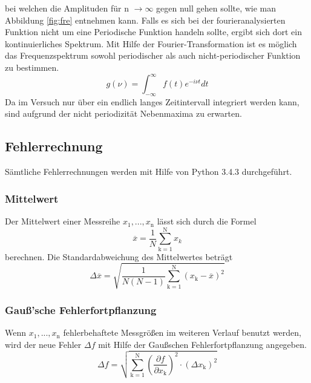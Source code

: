 bei welchen die Amplituden für n $\rightarrow \infty$ gegen null gehen sollte, wie man Abbildung \ref{fig:fre} entnehmen kann. Falls es sich bei der fourieranalysierten Funktion nicht um eine Periodische Funktion handeln sollte, ergibt sich dort ein kontinuierliches Spektrum.
Mit Hilfe der Fourier-Transformation ist es möglich das Frequenzspektrum sowohl periodischer als auch nicht-periodischer Funktion zu bestimmen. 
\begin{equation}
  g(\nu) = \int^{\infty}_{- \infty} f(t) e^{-i \nu t} dt
  \label{eqn:four-trafo}
\end{equation}
Da im Versuch nur über ein endlich langes Zeitintervall integriert werden kann, sind aufgrund der nicht periodizität Nebenmaxima zu erwarten. 
\subsection{Fehlerrechnung}
Sämtliche Fehlerrechnungen werden mit Hilfe von Python 3.4.3 durchgeführt.
\subsubsection{Mittelwert}
Der Mittelwert einer Messreihe $x_\text{1}, ... ,x_\text{n}$ lässt sich durch die Formel
\begin{equation}
	\overline{x} = \frac{1}{N} \sum_{\text{k}=1}^\text{N} x_k
	\label{eqn:ave}
\end{equation}
berechnen. Die Standardabweichung des Mittelwertes beträgt
\begin{equation}
	\Delta \overline{x} = \sqrt{ \frac{1}{N(N-1)} \sum_{\text{k}=1}^\text{N} (x_\text{k} - \overline{x})^2}
	\label{eqn:std}
\end{equation}

\subsubsection{Gauß'sche Fehlerfortpflanzung}
Wenn $x_\text{1}, ..., x_\text{n}$ fehlerbehaftete Messgrößen im weiteren Verlauf benutzt werden, wird der neue Fehler $\Delta f$ mit Hilfe der Gaußschen Fehlerfortpflanzung angegeben.
\begin{equation}
	\Delta f = \sqrt{\sum_{\text{k}=1}^\text{N} \left( \frac{ \partial f}{\partial x_\text{k}} \right) ^2 \cdot (\Delta x_\text{k})^2}
	\label{eqn:var}
\end{equation}

